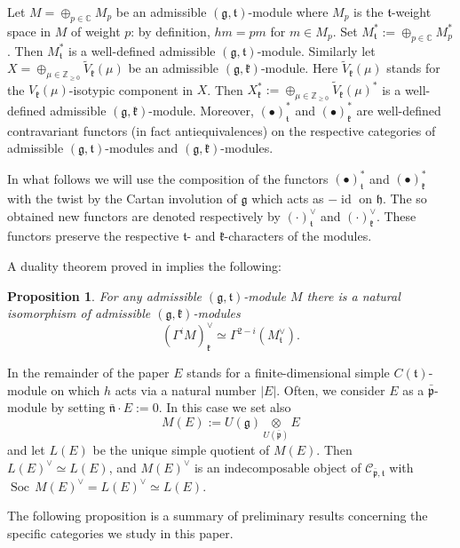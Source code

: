 \documentclass{tglat2e}
\newtheorem{prop}[theorem]{Proposition}
\theoremstyle{definition}
\theoremstyle{remark}
\renewcommand{\tt}{\mathfrak{t}}
\newcommand{\kk}{\mathfrak{k}}
\newcommand{\nn}{\mathfrak{n}}
\newcommand{\hh}{\mathfrak{h}}
\newcommand{\pp}{\mathfrak{p}}
\renewcommand{\gg}{\mathfrak{g}}
\DeclareMathOperator{\Soc}{Soc}
\begin{document}
Let $M=\oplus_{p\in\mathbb C} M_p$ be an admissible $(\gg,\tt)$-module where $M_p$ is the $\tt$-weight space in $M$ of weight $p$: by definition,
$hm=pm$ for $m\in M_p$. Set $M^*_\tt:=\oplus_{p\in\mathbb C} M^*_p$. Then $M^*_\tt$ is a well-defined admissible $(\gg,\tt)$-module. 
Similarly let $X=\oplus_{\mu\in\mathbb Z_{\geq 0}}\tilde V_\kk(\mu)$ be an admissible $(\gg,\kk)$-module. Here $\tilde V_\kk(\mu)$ stands for the $V_\kk(\mu)$-isotypic component in $X$. Then
$X^*_\kk:=\oplus_{\mu\in\mathbb Z_{\geq 0}}\tilde V_\kk(\mu)^*$ is a well-defined admissible $(\gg,\kk)$-module. 
Moreover, $(\bullet)_\tt^*$ and $(\bullet)_\kk^*$ are well-defined contravariant functors (in fact antiequivalences) on the respective categories
of admissible $(\gg,\tt)$-modules and $(\gg,\kk)$-modules.

In what follows we will use the composition of the functors $(\bullet)_\tt^*$ and $(\bullet)_\kk^*$ with the twist by the
Cartan involution of $\gg$ which acts as $-\operatorname{id}$ on $\hh$. The so obtained new functors are denoted respectively by  $(\cdot)_\tt^\vee$ and $(\cdot)_\kk^\vee$. These functors 
preserve the respective $\tt$- and $\kk$-characters of the modules.

A duality theorem proved in \cite{EW} implies the following:
\begin{prop}\label{prop:duality} For any admissible $(\gg,\tt)$-module $M$ there is a natural isomorphism of admissible $(\gg,\kk)$-modules
$$(\Gamma^iM)^\vee_\kk\simeq \Gamma^{2-i}(M^\vee_\tt).$$
\end{prop}

In the remainder of the paper $E$ stands for a finite-dimensional simple $C(\tt)$-module on which $h$ acts via a natural number $|E|$.  Often, we consider $E$ as a $\bar{\pp}$-module by setting $\bar{\nn}\cdot E:=0$.  In this case we set also 
	\begin{equation*}
		M(E):=U(\gg)\underset{U(\bar{\pp})}{\otimes}E
	\end{equation*}
	and let $L(E)$ be the unique simple quotient of $M(E)$.  Then $L(E)^\vee\simeq L(E)$, and $M(E)^\vee$ is an indecomposable object of $\mathcal{C}_{\bar{\pp},\tt}$ with $\Soc\,M(E)^\vee=L(E)^\vee\simeq L(E)$.

The following proposition is a summary of preliminary results concerning the specific categories we study in this paper.
\end{document}
